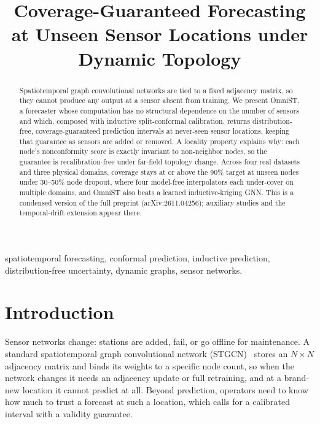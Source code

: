 \documentclass[conference]{IEEEtran}
\begin{document}
\title{Coverage-Guaranteed Forecasting at Unseen Sensor Locations under Dynamic Topology}

\author{
}

\maketitle

\begin{abstract}
Spatiotemporal graph convolutional networks are tied to a fixed adjacency matrix, so they cannot
produce any output at a sensor absent from training. We present OmniST, a forecaster whose computation
has no structural dependence on the number of sensors and which, composed with inductive split-conformal
calibration, returns distribution-free, coverage-guaranteed prediction intervals at never-seen sensor
locations, keeping that guarantee as sensors are added or removed. A locality property explains why: each
node's nonconformity score is exactly invariant to non-neighbor nodes, so the guarantee is
recalibration-free under far-field topology change. Across four real datasets and three physical domains,
coverage stays at or above the 90\% target at unseen nodes under 30--50\% node dropout, where four
model-free interpolators each under-cover on multiple domains, and OmniST also beats a learned
inductive-kriging GNN. This is a condensed version of the full preprint (arXiv:2611.04256); auxiliary
studies and the temporal-drift extension appear there.
\end{abstract}

\begin{IEEEkeywords}
spatiotemporal forecasting, conformal prediction, inductive prediction, distribution-free uncertainty,
dynamic graphs, sensor networks.
\end{IEEEkeywords}

\section{Introduction}
Sensor networks change: stations are added, fail, or go offline for maintenance. A standard
spatiotemporal graph convolutional network (STGCN)~\cite{yu2018stgcn} stores an $N\times N$ adjacency
matrix and binds its weights to a specific node count, so when the network changes it needs an adjacency
update or full retraining, and at a brand-new location it cannot predict at all. Beyond prediction,
operators need to know how much to trust a forecast at such a location, which calls for a calibrated
interval with a validity guarantee.
\end{document}
